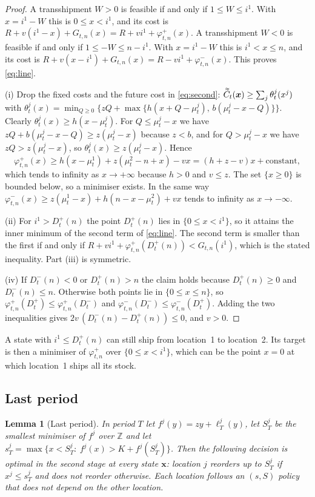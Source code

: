 \documentclass[11pt]{article}
\DeclareRobustCommand{\dbtilde}[1]{\accentset{\approx}{#1}}
\renewcommand{\vec}[1]{\boldsymbol{#1}}
\newcommand{\Z}{\mathbb{Z}}
\newcommand{\Cq}{\dbtilde{C}}
\newtheorem{lemma}{Lemma}
\theoremstyle{definition}
\begin{document}
\begin{proof}
A transshipment $W>0$ is feasible if and only if $1\le W\le i^1$. With $x=i^1-W$ this is $0\le x<i^1$, and its cost is $R+v(i^1-x)+G_{t,n}(x)=R+vi^1+\varphi^+_{t,n}(x)$. A transshipment $W<0$ is feasible if and only if $1\le -W\le n-i^1$. With $x=i^1-W$ this is $i^1<x\le n$, and its cost is $R+v(x-i^1)+G_{t,n}(x)=R-vi^1+\varphi^-_{t,n}(x)$. This proves \eqref{eq:line}.

(i) Drop the fixed costs and the future cost in \eqref{eq:second}: $\Cq_t(\vec{x})\ge\sum_j\theta^j_t(x^j)$ with $\theta^j_t(x)=\min_{Q\ge0}\{zQ+\max\{h(x+Q-\mu^j_t),\,b(\mu^j_t-x-Q)\}\}$. Clearly $\theta^j_t(x)\ge h(x-\mu^j_t)$. For $Q\le\mu^j_t-x$ we have $zQ+b(\mu^j_t-x-Q)\ge z(\mu^j_t-x)$ because $z<b$, and for $Q>\mu^j_t-x$ we have $zQ>z(\mu^j_t-x)$, so $\theta^j_t(x)\ge z(\mu^j_t-x)$. Hence
\[
\varphi^+_{t,n}(x)\ge h(x-\mu^1_t)+z(\mu^2_t-n+x)-vx=(h+z-v)x+\text{constant},
\]
which tends to infinity as $x\to+\infty$ because $h>0$ and $v\le z$. The set $\{x\ge0\}$ is bounded below, so a minimiser exists. In the same way $\varphi^-_{t,n}(x)\ge z(\mu^1_t-x)+h(n-x-\mu^2_t)+vx$ tends to infinity as $x\to-\infty$.

(ii) For $i^1>D^+_t(n)$ the point $D^+_t(n)$ lies in $\{0\le x<i^1\}$, so it attains the inner minimum of the second term of \eqref{eq:line}. The second term is smaller than the first if and only if $R+vi^1+\varphi^+_{t,n}(D^+_t(n))<G_{t,n}(i^1)$, which is the stated inequality. Part (iii) is symmetric.

(iv) If $D^-_t(n)<0$ or $D^+_t(n)>n$ the claim holds because $D^+_t(n)\ge0$ and $D^-_t(n)\le n$. Otherwise both points lie in $\{0\le x\le n\}$, so $\varphi^+_{t,n}(D^+_t)\le\varphi^+_{t,n}(D^-_t)$ and $\varphi^-_{t,n}(D^-_t)\le\varphi^-_{t,n}(D^+_t)$. Adding the two inequalities gives $2v\,(D^-_t(n)-D^+_t(n))\le0$, and $v>0$.
\end{proof}

A state with $i^1\le D^+_t(n)$ can still ship from location~1 to location~2. Its target is then a minimiser of $\varphi^+_{t,n}$ over $\{0\le x<i^1\}$, which can be the point $x=0$ at which location~1 ships all its stock.

\subsection{Last period}

\begin{lemma}[Last period]\label{lem:last}
In period $T$ let $f^j(y)=zy+\ell^j_T(y)$, let $S^j_T$ be the smallest minimiser of $f^j$ over $\Z$ and let $s^j_T=\max\{x<S^j_T:\ f^j(x)>K+f^j(S^j_T)\}$. Then the following decision is optimal in the second stage at every state $\vec{x}$: location $j$ reorders up to $S^j_T$ if $x^j\le s^j_T$ and does not reorder otherwise. Each location follows an $(s,S)$ policy that does not depend on the other location.
\end{lemma}
\end{document}
